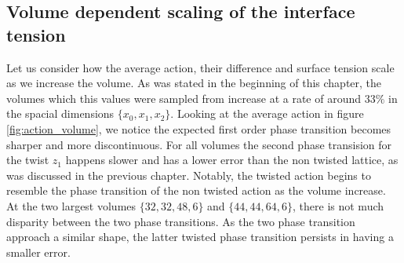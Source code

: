 \documentclass[english,twoside,openright]{UH_TCM_MSc}
\begin{document}
\subsection{Volume dependent scaling of the interface tension}

Let us consider how the average action, their difference and surface tension scale as we increase the volume. As was stated in the beginning of this chapter, the volumes which this values were sampled from increase at a rate of around $33\%$ in the spacial dimensions $\{x_0,x_1,x_2\}$. Looking at the average action in figure \ref{fig:action_volume}, we notice the expected first order phase transition \cite{Batrouni,GAVAI2002480} becomes sharper and more discontinuous. For all volumes the second phase transision for the twist $z_1$ happens slower and has a lower error than the non twisted lattice, as was discussed in the previous chapter. Notably, the twisted action begins to resemble the phase transition of the non twisted action as the volume increase. At the two largest volumes $\{32,32,48,6\}$ and $\{44,44,64,6\}$, there is not much disparity between the two phase transitions. As the two phase transition approach a similar shape, the latter twisted phase transition persists in having a smaller error. 
\end{document}
